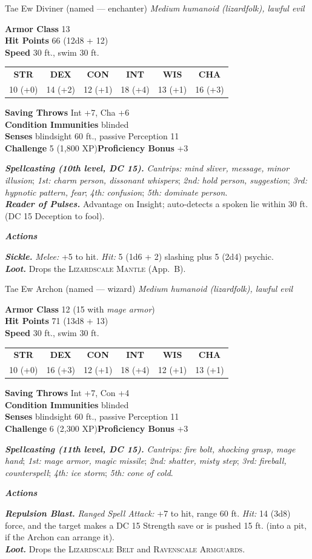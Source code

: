 \documentclass[10pt,twoside]{article}
\newcommand{\abilities}[6]{%
\begin{center}\small
\setlength{\tabcolsep}{6pt}\renewcommand{\arraystretch}{1.05}
\begin{tabular}{cccccc}
\textbf{STR}&\textbf{DEX}&\textbf{CON}&\textbf{INT}&\textbf{WIS}&\textbf{CHA}\\[1pt]
#1&#2&#3&#4&#5&#6\\
\end{tabular}\end{center}}
\newcommand{\sbrule}{\par\vspace{2pt}\noindent{\color{bloodred}\rule{\linewidth}{1.1pt}}\par\vspace{2pt}}
\newcommand{\eqname}[1]{\textsc{#1}}
\begin{document}
\begin{statblock}{Tae Ew Diviner \textnormal{(named --- enchanter)}}
\textit{Medium humanoid (lizardfolk), lawful evil}\sbrule
\textbf{Armor Class} 13\\
\textbf{Hit Points} 66 (12d8 + 12)\\
\textbf{Speed} 30 ft., swim 30 ft.\sbrule
\abilities{10 (+0)}{14 (+2)}{12 (+1)}{18 (+4)}{13 (+1)}{16 (+3)}
\sbrule
\textbf{Saving Throws} Int +7, Cha +6\\
\textbf{Condition Immunities} blinded\\
\textbf{Senses} blindsight 60 ft., passive Perception 11\\
\textbf{Challenge} 5 (1,800 XP)\hfill\textbf{Proficiency Bonus} +3\sbrule
\textbf{\textit{Spellcasting (10th level, DC 15).}} \emph{Cantrips:} \textit{mind
sliver, message, minor illusion}; \emph{1st:} \textit{charm person, dissonant
whispers}; \emph{2nd:} \textit{hold person, suggestion}; \emph{3rd:} \textit{hypnotic
pattern, fear}; \emph{4th:} \textit{confusion}; \emph{5th:} \textit{dominate person}.\\
\textbf{\textit{Reader of Pulses.}} Advantage on Insight; auto-detects a spoken lie
within 30 ft. (DC 15 Deception to fool).\sbrule
\textit{\textbf{Actions}}\par
\textbf{\textit{Sickle.}} \textit{Melee:} +5 to hit. \textit{Hit:} 5 (1d6 + 2)
slashing plus 5 (2d4) psychic.\\
\textbf{\textit{Loot.}} Drops the \eqname{Lizardscale Mantle} (App.\ B).
\end{statblock}

\begin{statblock}{Tae Ew Archon \textnormal{(named --- wizard)}}
\textit{Medium humanoid (lizardfolk), lawful evil}\sbrule
\textbf{Armor Class} 12 (15 with \textit{mage armor})\\
\textbf{Hit Points} 71 (13d8 + 13)\\
\textbf{Speed} 30 ft., swim 30 ft.\sbrule
\abilities{10 (+0)}{16 (+3)}{12 (+1)}{18 (+4)}{12 (+1)}{13 (+1)}
\sbrule
\textbf{Saving Throws} Int +7, Con +4\\
\textbf{Condition Immunities} blinded\\
\textbf{Senses} blindsight 60 ft., passive Perception 11\\
\textbf{Challenge} 6 (2,300 XP)\hfill\textbf{Proficiency Bonus} +3\sbrule
\textbf{\textit{Spellcasting (11th level, DC 15).}} \emph{Cantrips:} \textit{fire
bolt, shocking grasp, mage hand}; \emph{1st:} \textit{mage armor, magic missile};
\emph{2nd:} \textit{shatter, misty step}; \emph{3rd:} \textit{fireball, counterspell};
\emph{4th:} \textit{ice storm}; \emph{5th:} \textit{cone of cold}.\sbrule
\textit{\textbf{Actions}}\par
\textbf{\textit{Repulsion Blast.}} \textit{Ranged Spell Attack:} +7 to hit, range 60
ft. \textit{Hit:} 14 (3d8) force, and the target makes a DC 15 Strength save or is
pushed 15 ft. (into a pit, if the Archon can arrange it).\\
\textbf{\textit{Loot.}} Drops the \eqname{Lizardscale Belt} and \eqname{Ravenscale
Armguards}.
\end{statblock}
\end{document}
